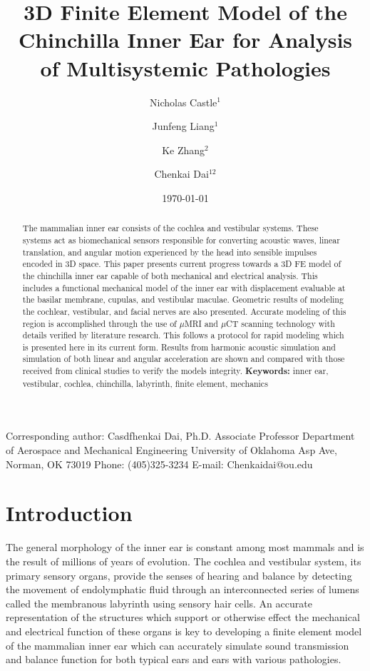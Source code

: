 \documentclass[12pt]{article}
\title{\textbf{3D Finite Element Model of the Chinchilla Inner Ear for Analysis of Multisystemic Pathologies}}
\author{Nicholas Castle$^1$ \and Junfeng Liang$^1$\and Ke Zhang$^2$\and Chenkai Dai$^{12}$}
\institute{$^1$School of Aerospace and Mechanical Engineering \\ $^2$Stephenson School of Biomedical Engineering \\ University of Oklahoma, Norman OK 73019}
\date{\today}
\begin{document}
\maketitle

\noindent Corresponding author: \newline
Casdfhenkai Dai, Ph.D. \newline
Associate Professor \newline
Department of Aerospace and Mechanical Engineering \newline
University of Oklahoma  Asp Ave, \newline
Norman, OK 73019 \newline
Phone: (405)325-3234 \newline
E-mail: Chenkaidai@ou.edu \newline


\begin{abstract}
The mammalian inner ear consists of the cochlea and vestibular systems. These systems act as biomechanical sensors responsible for converting acoustic waves, linear translation, and angular motion experienced by the head into sensible impulses encoded in 3D space. This paper presents current progress towards a 3D FE model of the chinchilla inner ear capable of both mechanical and electrical analysis. This includes a functional mechanical model of the inner ear with displacement evaluable at the basilar membrane, cupulas, and vestibular maculae. Geometric results of modeling the cochlear, vestibular, and facial nerves are also presented. Accurate modeling of this region is accomplished through the use of $\mu$MRI and $\mu$CT scanning technology with details verified by literature research. This follows a protocol for rapid modeling which is presented here in its current form. Results from harmonic acoustic simulation and simulation of both linear and angular acceleration are shown and compared with those received from clinical studies to verify the models integrity. \newline \newline \textbf{Keywords:} inner ear, vestibular, cochlea, chinchilla, labyrinth, finite element, mechanics
\end{abstract}


\section{Introduction}
The general morphology of the inner ear is constant among most mammals and is the result of millions of years of evolution. \cite{ekdale:chinchanat} The cochlea and vestibular system, its primary sensory organs, provide the senses of hearing and balance by detecting the movement of endolymphatic fluid through an interconnected series of lumens called the membranous labyrinth using sensory hair cells. An accurate representation of the structures which support or otherwise effect the mechanical and electrical function of these organs is key to developing a finite element model of the mammalian inner ear which can accurately simulate sound transmission and balance function for both typical ears and ears with various pathologies. 
\end{document}
